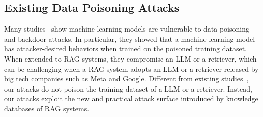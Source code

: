 \subsection{Existing Data Poisoning Attacks}
Many studies~\cite{biggio2012poisoning,gu2017badnets,liu2018trojaning,chen2017targeted,shafahi2018poison,bagdasaryan2020backdoor,fang2020local,zhang2021backdoor,jia2022badencoder,carlini2023poisoning} show machine learning models are vulnerable to data poisoning and backdoor attacks. In particular, they showed that a machine learning model has attacker-desired behaviors when trained on the poisoned training dataset. 
When extended to RAG systems, they compromise an LLM or a retriever, which can be challenging when a RAG system adopts an LLM or a retriever released by big tech companies such as Meta and Google.
Different from existing studies~\cite{biggio2012poisoning,gu2017badnets, shafahi2018poison,carlini2023poisoning}, our attacks do not poison the training dataset of a LLM or a retriever. 
Instead, our attacks exploit the new and practical attack surface introduced by knowledge databases of RAG systems.
